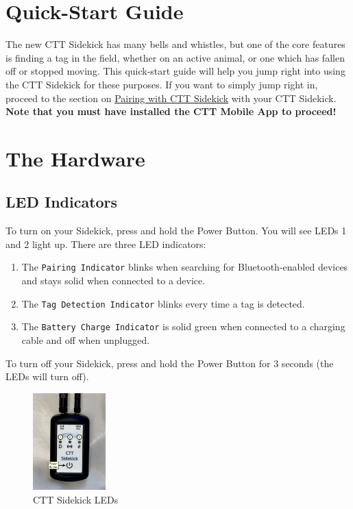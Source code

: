 \documentclass[
]{article}
\providecommand{\tightlist}{%
  \setlength{\itemsep}{0pt}\setlength{\parskip}{0pt}}
\begin{document}
\hypertarget{quick-start-guide}{%
\section{Quick-Start Guide}\label{quick-start-guide}}

The new CTT Sidekick has many bells and whistles, but one of the core
features is finding a tag in the field, whether on an active animal, or
one which has fallen off or stopped moving. This quick-start guide will
help you jump right into using the CTT Sidekick for these purposes. If
you want to simply jump right in, proceed to the section on
\protect\hyperlink{pairing-with-ctt-sidekick}{Pairing with CTT Sidekick}
with your CTT Sidekick. \textbf{Note that you must have installed the
CTT Mobile App to proceed!}

\hypertarget{the-hardware}{%
\section{The Hardware}\label{the-hardware}}

\hypertarget{led-indicators}{%
\subsection{LED Indicators}\label{led-indicators}}

To turn on your Sidekick, press and hold the Power Button. You will see
LEDs 1 and 2 light up. There are three LED indicators:

\begin{enumerate}
\def\labelenumi{\arabic{enumi}.}
\tightlist
\item
  The \texttt{Pairing\ Indicator} blinks when searching for
  Bluetooth-enabled devices and stays solid when connected to a device.
\item
  The \texttt{Tag\ Detection\ Indicator} blinks every time a tag is
  detected.
\item
  The \texttt{Battery\ Charge\ Indicator} is solid green when connected
  to a charging cable and off when unplugged.
\end{enumerate}

To turn off your Sidekick, press and hold the Power Button for 3 seconds
(the LEDs will turn off).

\begin{figure}
\hypertarget{id}{%
\centering
\includegraphics[width=0.25\textwidth,height=\textheight]{./images/Sidekick_LEDs.jpg}
\caption{CTT Sidekick LEDs}\label{id}
}
\end{figure}
\end{document}
